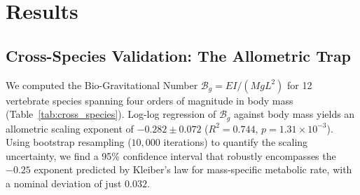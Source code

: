 \section{Results}

\subsection{Cross-Species Validation: The Allometric Trap}

We computed the Bio-Gravitational Number $\mathcal{B}_g = EI/(MgL^2)$ for 12 vertebrate species spanning four orders of magnitude in body mass (Table~\ref{tab:cross_species}). Log-log regression of $\mathcal{B}_g$ against body mass yields an allometric scaling exponent of $-0.282 \pm 0.072$ ($R^2 = 0.744$, $p = 1.31 \times 10^{-3}$). Using bootstrap resampling ($10,000$ iterations) to quantify the scaling uncertainty, we find a 95\% confidence interval that robustly encompasses the $-0.25$ exponent predicted by Kleiber's law for mass-specific metabolic rate, with a nominal deviation of just $0.032$.

